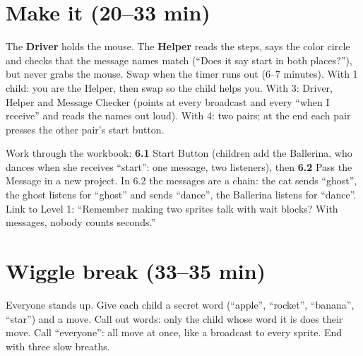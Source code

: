 \section{Make it (20--33 min)}
\begin{pairroles}
The \textbf{Driver} holds the mouse. The \textbf{Helper} reads the steps, says the color circle and checks that the message names match (\enquote{Does it say start in both places?}), but never grabs the mouse. Swap when the timer runs out (6--7 minutes). With 1 child: you are the Helper, then swap so the child helps you. With 3: Driver, Helper and Message Checker (points at every broadcast and every \enquote{when I receive} and reads the names out loud). With 4: two pairs; at the end each pair presses the other pair's start button.
\end{pairroles}

Work through the workbook: \textbf{6.1} Start Button (children add the Ballerina, who dances when she receives \enquote{start}: one message, two listeners), then \textbf{6.2} Pass the Message in a new project. In 6.2 the messages are a chain: the cat sends \enquote{ghost}, the ghost listens for \enquote{ghost} and sends \enquote{dance}, the Ballerina listens for \enquote{dance}. Link to Level 1: \enquote{Remember making two sprites talk with wait blocks? With messages, nobody counts seconds.}

\section{Wiggle break (33--35 min)}
Everyone stands up. Give each child a secret word (\enquote{apple}, \enquote{rocket}, \enquote{banana}, \enquote{star}) and a move. Call out words: only the child whose word it is does their move. Call \enquote{everyone}: all move at once, like a broadcast to every sprite. End with three slow breaths.

